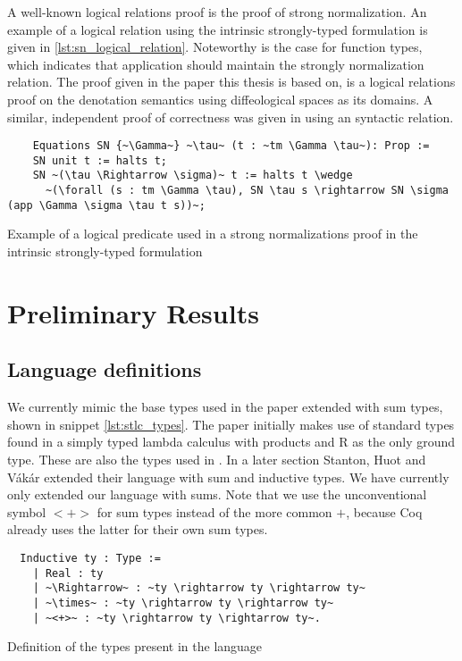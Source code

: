 \documentclass[12pt, final]{article}
\def\Vakar{V\'{a}k\'{a}r}
\begin{document}
A well-known logical relations proof is the proof of strong normalization.
An example of a logical relation using the intrinsic strongly-typed formulation is given in \ref{lst:sn_logical_relation}.
Noteworthy is the case for function types, which indicates that application should maintain the strongly normalization relation.
The proof given in the paper this thesis is based on, is a logical relations proof on the denotation semantics using diffeological spaces as its domains\cite{huot2020correctness}.
A similar, independent proof of correctness was given in \cite{barthe2020versatility} using an syntactic relation.

\begin{listing}
  \begin{verbatim}
    Equations SN {~\Gamma~} ~\tau~ (t : ~tm \Gamma \tau~): Prop :=
    SN unit t := halts t;
    SN ~(\tau \Rightarrow \sigma)~ t := halts t \wedge
      ~(\forall (s : tm \Gamma \tau), SN \tau s \rightarrow SN \sigma (app \Gamma \sigma \tau t s))~;
  \end{verbatim}
  \caption{Example of a logical predicate used in a strong normalizations proof in the intrinsic strongly-typed formulation}
  \label{lst:sn_logical_relation}
\end{listing}

\section{Preliminary Results}

\subsection{Language definitions}

We currently mimic the base types used in the paper\cite{huot2020correctness} extended with sum types, shown in snippet \ref{lst:stlc_types}. The paper initially makes use of standard types found in a simply typed lambda calculus with products and R as the only ground type. These are also the types used in \cite{barthe2020versatility}. In a later section Stanton, Huot and \Vakar{} extended their language with sum and inductive types. We have currently only extended our language with sums. Note that we use the unconventional symbol $<+>$ for sum types instead of the more common $+$, because Coq already uses the latter for their own sum types.

\begin{listing}
  \begin{verbatim}
  Inductive ty : Type :=
    | Real : ty
    | ~\Rightarrow~ : ~ty \rightarrow ty \rightarrow ty~
    | ~\times~ : ~ty \rightarrow ty \rightarrow ty~
    | ~<+>~ : ~ty \rightarrow ty \rightarrow ty~.
  \end{verbatim}
  \caption{Definition of the types present in the language}
  \label{lst:stlc_types}
\end{listing}
\end{document}
